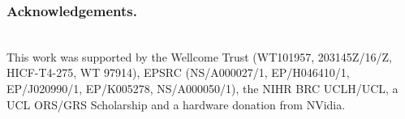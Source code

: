 \documentclass[runningheads,orivec,a4paper]{llncs}
\begin{document}
\subsubsection*{Acknowledgements.}\hspace*{\fill} \\
This work was supported by the Wellcome Trust (WT101957, 203145Z/16/Z, HICF-T4-275, WT 97914), EPSRC (NS/A000027/1, EP/H046410/1, EP/J020990/1, EP/K005278, NS/A000050/1), the NIHR BRC UCLH/UCL, a UCL ORS/GRS Scholarship and a hardware donation from NVidia.




\end{document}
